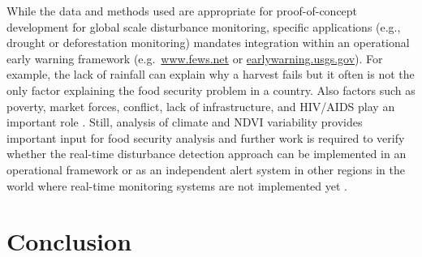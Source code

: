 \documentclass[authoryear,preprint,review,10pt]{elsarticle}
\begin{document}
\begin{enumerate}[(1)]

\end{enumerate}

While the data and methods used are appropriate for proof-of-concept development for global scale disturbance monitoring, specific applications (e.g., drought or deforestation monitoring) mandates integration within an operational early warning framework (e.g.\ \url{www.fews.net} or \url{earlywarning.usgs.gov}). For example, the lack of rainfall can explain why a harvest fails but it often is not the only factor explaining the food security problem in a country.  Also factors such as poverty, market forces, conflict, lack of infrastructure, and HIV/AIDS play an important role \citep{Funk:2011fg, Vrieling:2011da}. Still, analysis of climate and NDVI variability provides important input for food security analysis and further work is required to verify whether the real-time disturbance detection approach can be implemented in an operational framework or as an independent alert system in other regions in the world where real-time monitoring systems are not implemented yet \citep{Asner:2011fa}. 

\section{Conclusion}
\end{document}
